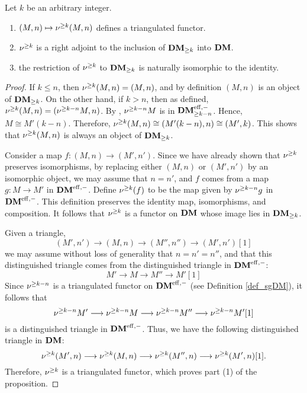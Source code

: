 \begin{prop}\label{prop_sDM_reflection}
Let $k$ be an arbitrary integer.

\begin{enumerate}
\item $(M, n) \mapsto \sgDM{k} (M, n)$ defines
a triangulated functor.

\item $\sgDM{k}$ is a right adjoint to the inclusion of 
$\GFiltDM[k]{\DM}$ into $\DM$.

\item the restriction of $\sgDM{k}$ to $\GFiltDM[k]{\DM}$ is 
naturally isomorphic to the identity.
\end{enumerate}
\end{prop}
\begin{proof}
If $k \leq n$, then $\sgDM{k}(M, n) = (M, n)$,
and by definition $(M, n)$ is an object of $\GFiltDM[k]{\DM}$.
On the other hand, if $k > n$, then as defined, $\sgDM{k}(M, n) = 
(\sgDM{k - n}M, n)$. By \cite[1.1]{HuKa}, $\sgDM{k - n}M$ is in 
$\GFiltDM[k - n]{\DMeff}$. Hence, $M \cong M'(k - n)$. Therefore,
$\sgDM{k}(M, n) \cong (M'(k - n), n) \cong (M', k)$. This shows
that $\sgDM{k}(M, n)$ is always an object of $\GFiltDM[k]{\DM}$.

Consider a map $f: (M, n) \to (M', n')$. Since we have already
shown that $\sgDM{k}$ preserves isomorphisms, by replacing either
$(M, n)$ or $(M', n')$ by an isomorphic object, we may assume that 
$n = n'$, and $f$ comes from a map $g: M \to M'$ in $\DMeff$. 
Define $\sgDM{k}(f)$ to be the map given by $\sgDM{k - n}{g}$ in 
$\DMeff$. This definition preserves the identity map, 
isomorphisms, and composition. It follows that $\sgDM{k}$ is a 
functor on $\DM$ whose image lies in $\GFiltDM[k]{\DM}$.

Given a triangle,
\[
(M', n') \to (M, n) \to (M'', n'') \to (M', n')[1]
\]
we may assume without loss of generality that $n = n' = n''$,
and that this distinguished triangle comes from the distinguished
triangle in $\DMeff$:
\[
M' \to M \to M'' \to M'[1]
\]
Since $\sgDM{k - n}$ is a triangulated functor on $\DMeff$ (see 
Definition \ref{def_sgDM}), it follows that
\[
\sgDM{k - n}M' \to \sgDM{k - n}M \to \sgDM{k - n}M'' \to
\sgDM{k - n}M'[1]
\]
is a distinguished triangle in $\DMeff$. Thus, we have the 
following distinguished triangle in $\DM$:
\[
\sgDM{k}(M', n) \to \sgDM{k}(M, n) \to \sgDM{k}(M'', n)
   \to \sgDM{k}(M', n)[1].
\]
Therefore, $\sgDM{k}$ is a triangulated functor, which
proves part (1) of the proposition.


\end{proof}
